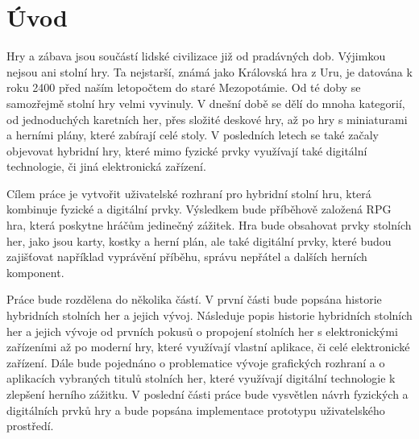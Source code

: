 \chapter{Úvod}
Hry a zábava jsou součástí lidské civilizace již od pradávných dob. Výjimkou nejsou ani stolní hry. Ta nejstarší, známá jako Královská hra z Uru\cite{royal_game_of_ur}, je datována k roku 2400 před naším letopočtem do staré Mezopotámie. Od té doby se samozřejmě stolní hry velmi vyvinuly. V dnešní době se dělí do mnoha kategorií, od jednoduchých karetních her, přes složité deskové hry, až po hry s miniaturami a herními plány, které zabírají celé stoly. V posledních letech se také začaly objevovat hybridní hry, které mimo fyzické prvky využívají také digitální technologie, či jiná elektronická zařízení.

Cílem práce je vytvořit uživatelské rozhraní pro hybridní stolní hru, která kombinuje fyzické a digitální prvky. Výsledkem bude příběhově založená RPG hra, která poskytne hráčům jedinečný zážitek. Hra bude obsahovat prvky stolních her, jako jsou karty, kostky a herní plán, ale také digitální prvky, které budou zajišťovat například vyprávění příběhu, správu nepřátel a dalších herních komponent.

Práce bude rozdělena do několika částí. V první části bude popsána historie hybridních stolních her a jejich vývoj. Následuje popis historie hybridních stolních her a jejich vývoje od prvních pokusů o propojení stolních her s elektronickými zařízeními až po moderní hry, které využívají vlastní aplikace, či celé elektronické zařízení. Dále bude pojednáno o problematice vývoje grafických rozhraní a o aplikacích vybraných titulů stolních her, které využívají digitální technologie k zlepšení herního zážitku. V poslední části práce bude vysvětlen návrh fyzických a digitálních prvků hry a bude popsána implementace prototypu uživatelského prostředí.